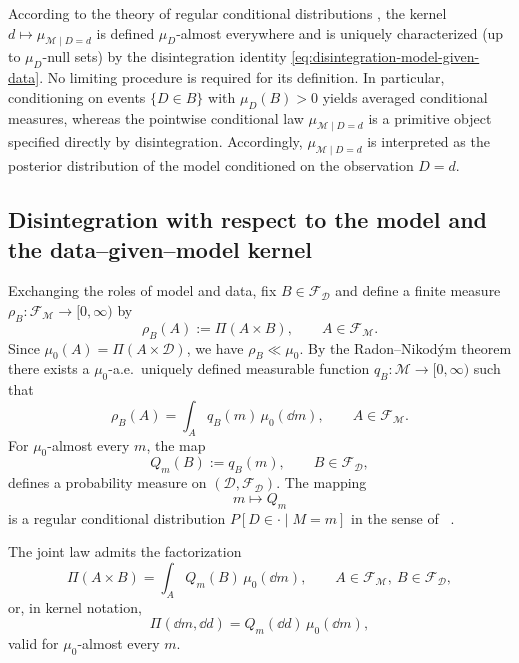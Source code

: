 \documentclass[11pt]{article}
\theoremstyle{remark}
\newcommand{\modelspace}{\mathcal{M}}
\newcommand{\dataspace}{\mathcal{D}}
\begin{document}
According to the theory of regular conditional distributions
\cite[Theorem~5.3]{Kallenberg2021}, the kernel
\(d\mapsto\mu_{\modelspace\mid D=d}\) is defined \(\mu_D\)-almost everywhere
and is uniquely characterized (up to \(\mu_D\)-null sets) by the
disintegration identity
\eqref{eq:disintegration-model-given-data}.  No limiting procedure is
required for its definition.  In particular, conditioning on events
\(\{D\in B\}\) with \(\mu_D(B)>0\) yields averaged conditional measures,
whereas the pointwise conditional law \(\mu_{\modelspace\mid D=d}\) is a
primitive object specified directly by disintegration.
Accordingly, \(\mu_{\modelspace\mid D=d}\) is interpreted as the posterior
distribution of the model conditioned on the observation \(D=d\).


\subsection{Disintegration with respect to the model and the data--given--model kernel}

Exchanging the roles of model and data, fix
\(B\in\mathcal F_{\dataspace}\) and define a finite measure
\(\rho_B:\mathcal F_{\modelspace}\to[0,\infty)\) by
\begin{equation}
  \rho_B(A) := \Pi(A\times B),
  \qquad
  A\in\mathcal F_{\modelspace}.
\end{equation}
Since \(\mu_0(A)=\Pi(A\times\dataspace)\), we have \(\rho_B\ll\mu_0\).
By the Radon--Nikodým theorem there exists a \(\mu_0\)-a.e.\ uniquely defined
measurable function \(q_B:\modelspace\to[0,\infty)\) such that
\begin{equation}
  \rho_B(A)
  =
  \int_A q_B(m)\,\mu_0(\dd m),
  \qquad
  A\in\mathcal F_{\modelspace}.
\end{equation}
For \(\mu_0\)-almost every \(m\), the map
\begin{equation}
  Q_m(B) := q_B(m),
  \qquad
  B\in\mathcal F_{\dataspace},
\end{equation}
defines a probability measure on \((\dataspace,\mathcal F_{\dataspace})\).
The mapping
\begin{equation}
  m\longmapsto Q_m
\end{equation}
is a regular conditional distribution \(P[D\in\cdot\mid M=m]\) in the sense of
~\cite[Theorem~5.3]{Kallenberg2021}.

The joint law admits the factorization
\begin{equation}\label{eq:joint-via-Q}
  \Pi(A\times B)
  =
  \int_A Q_m(B)\,\mu_0(\dd m),
  \qquad
  A\in\mathcal F_{\modelspace},\ B\in\mathcal F_{\dataspace},
\end{equation}
or, in kernel notation,
\begin{equation}
  \Pi(\dd m,\dd d) = Q_m(\dd d)\,\mu_0(\dd m),
\end{equation}
valid for \(\mu_0\)-almost every \(m\).
\end{document}

